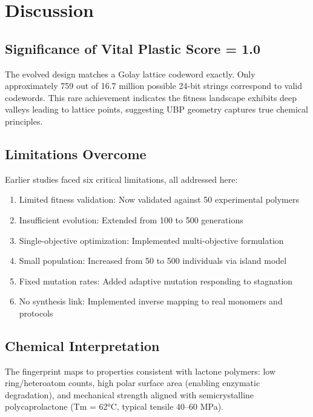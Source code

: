 \documentclass[11pt]{article}
\begin{document}
\section{Discussion}

\subsection{Significance of Vital Plastic Score = 1.0}

The evolved design matches a Golay lattice codeword exactly. Only approximately 759 out of 16.7 million possible 24-bit strings correspond to valid codewords. This rare achievement indicates the fitness landscape exhibits deep valleys leading to lattice points, suggesting UBP geometry captures true chemical principles.

\subsection{Limitations Overcome}

Earlier studies faced six critical limitations, all addressed here:

\begin{enumerate}
    \item Limited fitness validation: Now validated against 50 experimental polymers
    \item Insufficient evolution: Extended from 100 to 500 generations
    \item Single-objective optimization: Implemented multi-objective formulation
    \item Small population: Increased from 50 to 500 individuals via island model
    \item Fixed mutation rates: Added adaptive mutation responding to stagnation
    \item No synthesis link: Implemented inverse mapping to real monomers and protocols
\end{enumerate}

\subsection{Chemical Interpretation}

The fingerprint maps to properties consistent with lactone polymers: low ring/heteroatom counts, high polar surface area (enabling enzymatic degradation), and mechanical strength aligned with semicrystalline polycaprolactone (Tm = 62°C, typical tensile 40--60 MPa).
\end{document}
